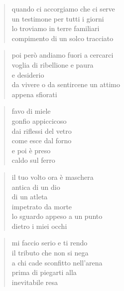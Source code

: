 \begin{poem}
\begin{poem}
\clearpage


	\begin{verse}
		quando ci accorgiamo che ci serve\\
		un testimone per tutti i giorni\\
		lo troviamo in terre familiari\\
		compimento di un solco tracciato
	\end{verse}

	\begin{verse}
		poi però andiamo fuori a cercarci\\
		voglia di ribellione e paura\\
		e desiderio\\
		da vivere o da sentircene un attimo\\
		appena sfiorati
	\end{verse}

\clearpage


	\begin{verse}
		favo di miele\\
		gonfio appiccicoso\\
		dai riflessi del vetro\\
		come esce dal forno\\
		e poi è preso\\
		caldo sul ferro
	\end{verse}

	\begin{verse}
		il tuo volto ora è maschera\\
		antica di un dio\\
		di un atleta\\
		impetrato da morte\\
		lo sguardo appeso a un punto\\
		dietro i miei occhi
	\end{verse}

	\begin{verse}
		mi faccio serio e ti rendo\\
		il tributo che non si nega\\
		a chi cade sconfitto nell'arena\\
		prima di piegarti alla\\
		inevitabile resa
	\end{verse}

\clearpage



\end{poem}
\end{poem}
